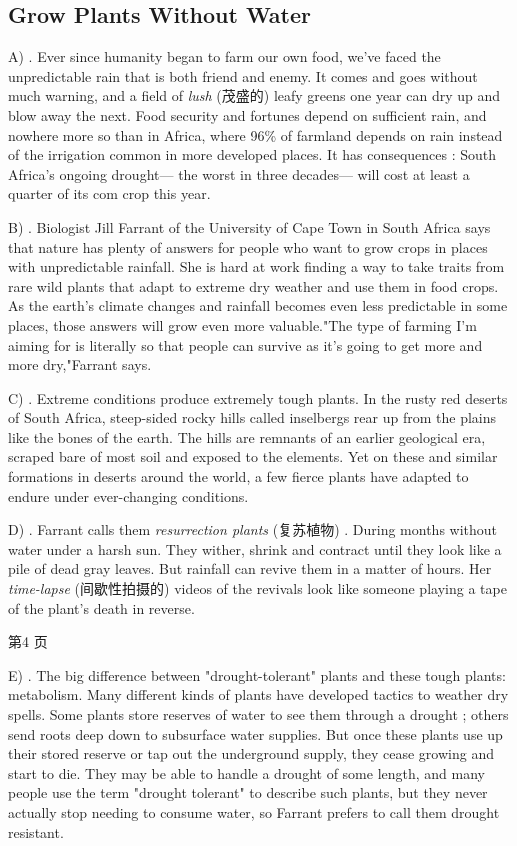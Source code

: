 \documentclass[UTF8,11pt]{ctexart}
\begin{document}
\subsection*{\textbf{Grow Plants Without Water}}


A) . Ever since humanity began to farm our own food, we've faced the unpredictable rain that is both friend and enemy. It comes and goes without much warning, and a field of\textit{ lush} (茂盛的) leafy greens one year can dry up and blow away the next. Food security and fortunes depend on sufficient rain, and nowhere more so than in Africa, where 96\% of farmland depends on rain instead of the irrigation common in more developed places. It has consequences : South Africa's ongoing drought— the worst in three decades— will cost at least a quarter of its com crop this year.


B) . Biologist Jill Farrant of the University of Cape Town in South Africa says that nature has plenty of answers for people who want to grow crops in places with unpredictable rainfall. She is hard at work finding a way to take traits from rare wild plants that adapt to extreme dry weather and use them in food crops. As the earth's climate changes and rainfall becomes even less predictable in some places, those answers will grow even more valuable."The type of farming I'm aiming for is literally so that people can survive as it's going to get more and more dry,"Farrant says.


C) . Extreme conditions produce extremely tough plants. In the rusty red deserts of South Africa, steep-sided rocky hills called inselbergs rear up from the plains like the bones of the earth. The hills are remnants of an earlier geological era, scraped bare of most soil and exposed to the elements. Yet on these and similar formations in deserts around the world, a few fierce plants have adapted to endure under ever-changing conditions.


D) . Farrant calls them\textit{ resurrection plants} (复苏植物) . During months without water under a harsh sun. They wither, shrink and contract until they look like a pile of dead gray leaves. But rainfall can revive them in a matter of hours. Her\textit{ time-lapse} (间歇性拍摄的) videos of the revivals look like someone playing a tape of the plant's death in reverse.


第4 页


E) . The big difference between "drought-tolerant" plants and these tough plants: metabolism. Many different kinds of plants have developed tactics to weather dry spells. Some plants store reserves of water to see them through a drought ; others send roots deep down to subsurface water supplies. But once these plants use up their stored reserve or tap out the underground supply, they cease growing and start to die. They may be able to handle a drought of some length, and many people use the term "drought tolerant" to describe such plants, but they never actually stop needing to consume water, so Farrant prefers to call them drought resistant.
\end{document}
